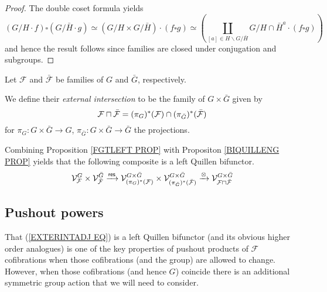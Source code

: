 \documentclass[a4paper,10pt]{article}%
\begin{document}
\begin{proof}
	The double coset formula yields
\[
	\left(G/H \cdot f\right) \square \left(G/\bar{H} \cdot g\right)
		\simeq
	\left(G/H \times G/\bar{H}\right) \cdot \left(f \square g\right)
		\simeq
	\left(
		\coprod_{[a]\in H \backslash G /\bar{H}}
		{G/H\cap \bar{H}^a} \cdot (f \square g)
	\right)
\]
and hence the result follows since families are closed under conjugation and subgroups.
\end{proof}


\begin{definition}\label{EXTERINT DEF}
Let $\mathcal{F}$ and $\bar{\mathcal{F}}$ be families of $G$ and $\bar{G}$, respectively.

We define their \textit{external intersection} to be the 
family of $G \times \bar{G}$ given by
\[
	\mathcal{F} \sqcap \bar{\mathcal{F}}
=
	(\pi_{G})^{\**} (\mathcal{F}) 
		\cap
	(\pi_{\bar{G}})^{\**} (\bar{\mathcal{F}})
\]
for 
$\pi_G \colon G \times \bar{G} \to G$,
$\pi_{\bar{G}} \colon G \times \bar{G} \to \bar{G}$
the projections.
\end{definition}


\begin{remark}
	Combining Proposition \ref{FGTLEFT PROP} 
	with Propositon \ref{BIQUILLENG PROP} yields that
	the following composite is a left Quillen bifunctor.
\begin{equation}\label{EXTERINTADJ EQ}
	\mathcal{V}^{G}_{\mathcal{F}}
		\times
	\mathcal{V}^{\bar{G}}_{\bar{\mathcal{F}}}
		\xrightarrow{\mathsf{res}}
	\mathcal{V}^{G \times \bar{G}}_{
	(\pi_G)^{\**}(\mathcal{F})}
		\times
	\mathcal{V}^{G \times \bar{G}}_{
	(\pi_{\bar{G}})^{\**}(\bar{\mathcal{F}})}
		\xrightarrow{\otimes}
	\mathcal{V}^{G \times \bar{G}}_{
	\mathcal{F} \sqcap \bar{\mathcal{F}}}
\end{equation}
\end{remark}


\subsection{Pushout powers}\label{PUSHPOW SEC}

That (\ref{EXTERINTADJ EQ}) is a left Quillen bifunctor (and its obvious higher order analogues) is one of the key properties of pushout products of $\mathcal{F}$ cofibrations when those cofibrations (and the group) are allowed to change. However, when those cofibrations (and hence $G$) coincide there is an additional symmetric group action that  we will need to consider.
\end{document}
